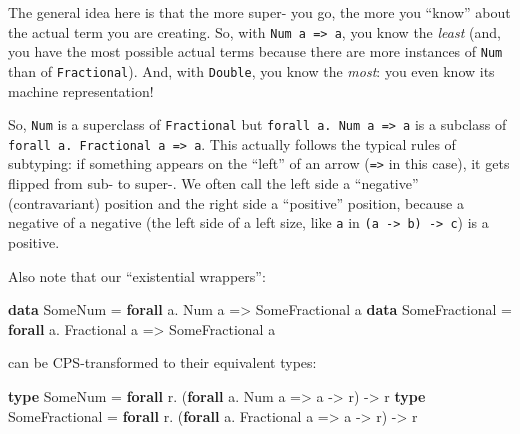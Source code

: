 \documentclass[]{article}
\newenvironment{Shaded}{}{}
\newcommand{\DataTypeTok}[1]{\textcolor[rgb]{0.56,0.13,0.00}{#1}}
\newcommand{\KeywordTok}[1]{\textcolor[rgb]{0.00,0.44,0.13}{\textbf{#1}}}
\newcommand{\NormalTok}[1]{#1}
\newcommand{\OperatorTok}[1]{\textcolor[rgb]{0.40,0.40,0.40}{#1}}
\newcommand{\OtherTok}[1]{\textcolor[rgb]{0.00,0.44,0.13}{#1}}
\begin{document}
The general idea here is that the more super- you go, the more you ``know''
about the actual term you are creating. So, with
\texttt{Num\ a\ =\textgreater{}\ a}, you know the \emph{least} (and, you have
the most possible actual terms because there are more instances of \texttt{Num}
than of \texttt{Fractional}). And, with \texttt{Double}, you know the
\emph{most}: you even know its machine representation!

So, \texttt{Num} is a superclass of \texttt{Fractional} but
\texttt{forall\ a.\ Num\ a\ =\textgreater{}\ a} is a subclass of
\texttt{forall\ a.\ Fractional\ a\ =\textgreater{}\ a}. This actually follows
the typical rules of subtyping: if something appears on the ``left'' of an arrow
(\texttt{=\textgreater{}} in this case), it gets flipped from sub- to super-. We
often call the left side a ``negative'' (contravariant) position and the right
side a ``positive'' position, because a negative of a negative (the left side of
a left size, like \texttt{a} in
\texttt{(a\ -\textgreater{}\ b)\ -\textgreater{}\ c}) is a positive.

Also note that our ``existential wrappers'':

\begin{Shaded}
\begin{Highlighting}[]
\KeywordTok{data} \DataTypeTok{SomeNum} \OtherTok{=} \KeywordTok{forall}\NormalTok{ a}\OperatorTok{.} \DataTypeTok{Num}\NormalTok{ a }\OtherTok{=\textgreater{}} \DataTypeTok{SomeFractional}\NormalTok{ a}
\KeywordTok{data} \DataTypeTok{SomeFractional} \OtherTok{=} \KeywordTok{forall}\NormalTok{ a}\OperatorTok{.} \DataTypeTok{Fractional}\NormalTok{ a }\OtherTok{=\textgreater{}} \DataTypeTok{SomeFractional}\NormalTok{ a}
\end{Highlighting}
\end{Shaded}

can be CPS-transformed to their equivalent types:

\begin{Shaded}
\begin{Highlighting}[]
\KeywordTok{type} \DataTypeTok{SomeNum} \OtherTok{=} \KeywordTok{forall}\NormalTok{ r}\OperatorTok{.}\NormalTok{ (}\KeywordTok{forall}\NormalTok{ a}\OperatorTok{.} \DataTypeTok{Num}\NormalTok{ a }\OtherTok{=\textgreater{}}\NormalTok{ a }\OtherTok{{-}\textgreater{}}\NormalTok{ r) }\OtherTok{{-}\textgreater{}}\NormalTok{ r}
\KeywordTok{type} \DataTypeTok{SomeFractional} \OtherTok{=} \KeywordTok{forall}\NormalTok{ r}\OperatorTok{.}\NormalTok{ (}\KeywordTok{forall}\NormalTok{ a}\OperatorTok{.} \DataTypeTok{Fractional}\NormalTok{ a }\OtherTok{=\textgreater{}}\NormalTok{ a }\OtherTok{{-}\textgreater{}}\NormalTok{ r) }\OtherTok{{-}\textgreater{}}\NormalTok{ r}
\end{Highlighting}
\end{Shaded}
\end{document}
